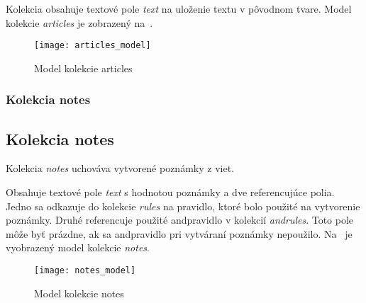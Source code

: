 Kolekcia obsahuje textové pole \textit{text} na uloženie textu v pôvodnom tvare. Model kolekcie \textit{articles} je zobrazený na~.

\begin{figure}[H]
	\begin{center}\texttt{[image: articles\_model]}\end{center}
	\caption[Model kolekcie articles]{Model kolekcie articles}\label{fig:articles_collection_model}
\end{figure}

%
%
{
	\subsubsection{Kolekcia notes}
}
{
	\subsection{Kolekcia notes}
}
\label{subsubsection:collection_notes}
Kolekcia \textit{notes} uchováva vytvorené poznámky z viet.

Obsahuje textové pole \textit{text} s hodnotou poznámky a dve referencujúce polia. Jedno sa odkazuje do kolekcie \textit{rules} na pravidlo, ktoré bolo použité na vytvorenie poznámky. Druhé referencuje použité and\hyph pravidlo v kolekcií \textit{and\textunderscore rules}. Toto pole môže byť prázdne, ak sa and\hyph pravidlo pri vytváraní poznámky nepoužilo. Na~ je vyobrazený model kolekcie \textit{notes}.

\begin{figure}[H]
	\begin{center}\texttt{[image: notes\_model]}\end{center}
	\caption[Model kolekcie notes]{Model kolekcie notes}\label{fig:notes_collection_model}
\end{figure}

